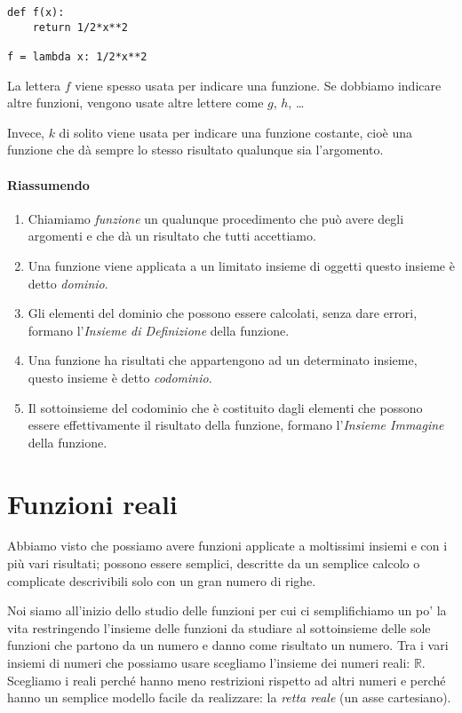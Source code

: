 \begin{lstlisting}
def f(x):
    return 1/2*x**2

f = lambda x: 1/2*x**2
\end{lstlisting}

\begin{osservazione}
La lettera \(f\) viene spesso usata per indicare una funzione. 
Se dobbiamo indicare altre funzioni, 
vengono usate altre lettere come \(g\), \(h\), \dots

Invece, \(k\) di solito viene usata per indicare una funzione costante, cioè 
una funzione che dà sempre lo stesso risultato qualunque sia l'argomento.
\end{osservazione}

\paragraph{Riassumendo}

\begin{enumerate} [noitemsep]
\item Chiamiamo \emph{funzione} un qualunque procedimento che può avere 
degli argomenti e che dà un risultato che tutti accettiamo.
\item Una funzione viene applicata a un limitato insieme di oggetti questo 
insieme è detto \emph{dominio}.
\item Gli elementi del dominio che possono essere calcolati, senza dare 
errori, formano l'\emph{Insieme di Definizione} della funzione.
\item Una funzione ha risultati che appartengono ad un determinato insieme, 
questo insieme è detto \emph{codominio}.
\item Il sottoinsieme del codominio che è costituito dagli elementi che 
possono essere effettivamente il risultato della funzione, formano 
l'\emph{Insieme Immagine} della funzione.
\end{enumerate}

\section{Funzioni reali}
\label{sec:funzioni2_reali}

Abbiamo visto che possiamo avere funzioni applicate a moltissimi insiemi e 
con i più vari risultati; possono essere semplici, descritte da un semplice 
calcolo o complicate descrivibili solo con un gran numero di righe.

Noi siamo all'inizio dello studio delle funzioni per cui ci 
semplifichiamo un po' la vita restringendo l'insieme delle funzioni da 
studiare al sottoinsieme delle sole funzioni che partono da un numero e 
danno come risultato un numero. 
Tra i vari insiemi di numeri che possiamo usare scegliamo l'insieme dei 
numeri reali: \(\mathbb{R}\). Scegliamo i reali perché hanno meno restrizioni 
rispetto ad altri numeri e perché hanno un semplice modello facile da 
realizzare: 
la \emph{retta reale} (un asse cartesiano).

